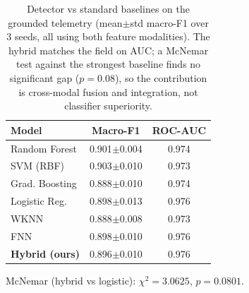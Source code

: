 \begin{table}[t]
\centering
\caption{Detector vs standard baselines on the grounded telemetry (mean$\pm$std macro-F1 over 3 seeds, all using both feature modalities). The hybrid matches the field on AUC; a McNemar test against the strongest baseline finds no significant gap ($p{=}0.08$), so the contribution is cross-modal fusion and integration, not classifier superiority.}
\label{tab:baselines}
\begin{tabular}{lcc}
\toprule
Model & Macro-F1 & ROC-AUC \\
\midrule
Random Forest & 0.901$\pm$0.004 & 0.974 \\
SVM (RBF) & 0.903$\pm$0.010 & 0.973 \\
Grad. Boosting & 0.888$\pm$0.010 & 0.974 \\
Logistic Reg. & 0.898$\pm$0.013 & 0.976 \\
WKNN & 0.888$\pm$0.008 & 0.973 \\
FNN & 0.898$\pm$0.010 & 0.976 \\
\textbf{Hybrid (ours)} & 0.896$\pm$0.010 & 0.976 \\
\bottomrule
\end{tabular}
\par\smallskip
{\footnotesize McNemar (hybrid vs logistic): $\chi^2{=}3.0625$, $p{=}0.0801$.}
\end{table}
